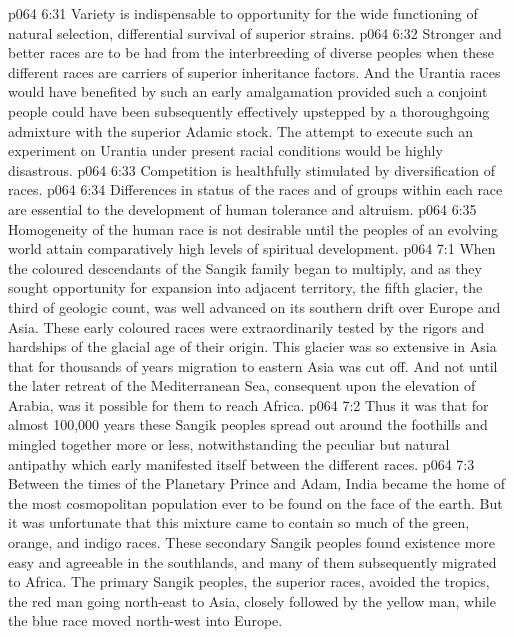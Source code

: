 \vs p064 6:31 \bibnobreakspace Variety is indispensable to opportunity for the wide functioning of natural selection, differential survival of superior strains.
\vs p064 6:32 \bibnobreakspace Stronger and better races are to be had from the interbreeding of diverse peoples when these different races are carriers of superior inheritance factors. And the Urantia races would have benefited by such an early amalgamation provided such a conjoint people could have been subsequently effectively upstepped by a thoroughgoing admixture with the superior Adamic stock. The attempt to execute such an experiment on Urantia under present racial conditions would be highly disastrous.
\vs p064 6:33 \bibnobreakspace Competition is healthfully stimulated by diversification of races.
\vs p064 6:34 \bibnobreakspace Differences in status of the races and of groups within each race are essential to the development of human tolerance and altruism.
\vs p064 6:35 \bibnobreakspace Homogeneity of the human race is not desirable until the peoples of an evolving world attain comparatively high levels of spiritual development.
\vs p064 7:1 When the coloured descendants of the Sangik family began to multiply, and as they sought opportunity for expansion into adjacent territory, the fifth glacier, the third of geologic count, was well advanced on its southern drift over Europe and Asia. These early coloured races were extraordinarily tested by the rigors and hardships of the glacial age of their origin. This glacier was so extensive in Asia that for thousands of years migration to eastern Asia was cut off. And not until the later retreat of the Mediterranean Sea, consequent upon the elevation of Arabia, was it possible for them to reach Africa.
\vs p064 7:2 Thus it was that for almost 100,000 years these Sangik peoples spread out around the foothills and mingled together more or less, notwithstanding the peculiar but natural antipathy which early manifested itself between the different races.
\vs p064 7:3 Between the times of the Planetary Prince and Adam, India became the home of the most cosmopolitan population ever to be found on the face of the earth. But it was unfortunate that this mixture came to contain so much of the green, orange, and indigo races. These secondary Sangik peoples found existence more easy and agreeable in the southlands, and many of them subsequently migrated to Africa. The primary Sangik peoples, the superior races, avoided the tropics, the red man going north\hyp{}east to Asia, closely followed by the yellow man, while the blue race moved north\hyp{}west into Europe.
